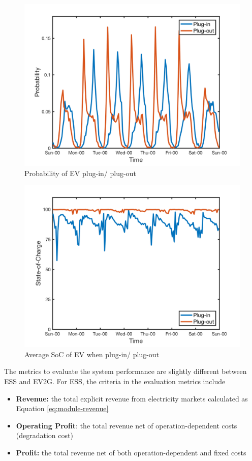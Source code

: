 \begin{figure}[h!]
	\centering
		\centering
		\includegraphics[width=0.8\linewidth]{Figures/Data_EV_number}
		\caption{Probability of EV plug-in/ plug-out}
		\label{fig:data-ev-number}
\end{figure}

\begin{figure}[h!]
	\centering
		\includegraphics[width=0.8\linewidth]{Figures/Data_SoC}
		\caption{Average SoC of EV when plug-in/ plug-out}
		\label{fig:data-soc}
\end{figure}

The metrics to evaluate the system performance are slightly different between ESS and EV2G. For ESS, the criteria in the evaluation metrics include
\begin{itemize}
	\item \textbf{Revenue:} the total explicit revenue from electricity markets calculated as Equation \eqref{eq:module-revenue}
	\item \textbf{Operating Profit}: the total revenue net of operation-dependent costs (degradation cost)
	\item \textbf{Profit:} the total revenue net of both operation-dependent and fixed costs
\end{itemize}

